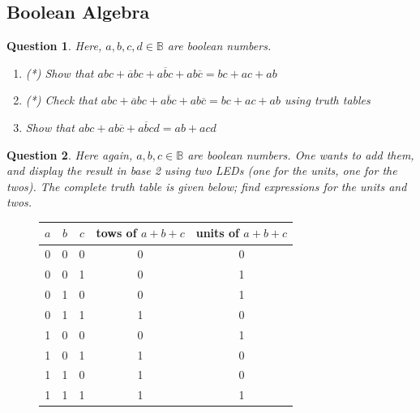 \documentclass[]{article}
\newtheorem{question}{Question}
\newcommand{\B}{\mathbb{B}}
\begin{document}
\subsection{Boolean Algebra}
\begin{question}
	Here, $a,b,c,d \in \B$ are boolean numbers.
	\begin{enumerate}[label=\alph*.]
		\item (*) Show that $abc+\overline{a}bc+a\overline{b}c+ab\overline{c}=bc+ac+ab$
		\item (*) Check that $abc+\overline{a}bc+a\overline{b}c+ab\overline{c}=bc+ac+ab$ using truth tables
		\item Show that $abc+ab\overline{c}+a\overline{b}cd=ab+acd$
	\end{enumerate}
\end{question}
\begin{question}
	Here again, $a,b,c \in \B$ are boolean numbers. One wants to add them, and display the result in base 2 using two LEDs (one for the units, one for the twos).
	The complete truth table is given below; find expressions for the units and twos.
\end{question}
\begin{figure}[h!]
	\begin{center}
		\begin{tabular}{ c c c | c | c }
			$a$ & $b$ & $c$ & tows of $a+b+c$ & units of $a+b+c$ \\
			\hline
			0 & 0 & 0 & 0 & 0\\  
			0 & 0 & 1 & 0 & 1\\
			0 & 1 & 0 & 0 & 1\\  
			0 & 1 & 1 & 1 & 0\\
			1 & 0 & 0 & 0 & 1\\  
			1 & 0 & 1 & 1 & 0\\
			1 & 1 & 0 & 1 & 0\\  
			1 & 1 & 1 & 1 & 1\\
		\end{tabular}
	\end{center}
\end{figure}
\end{document}
